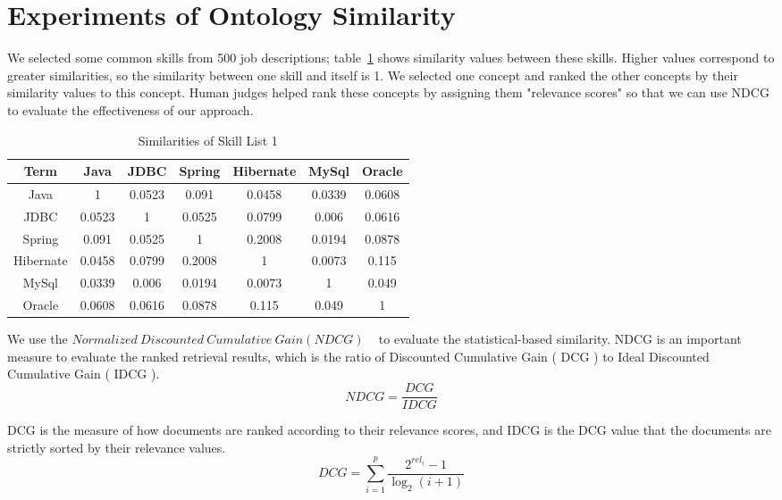 \section{Experiments of Ontology Similarity}

We selected some common skills from 500 job descriptions; table~\ref{tab:dismatrix3} shows similarity values between these skills. Higher values correspond to greater similarities, so the similarity between one skill and itself is 1. We selected one concept and ranked the other concepts by their similarity values to this concept. Human judges helped rank these concepts by assigning them "relevance scores" so that we can use NDCG to evaluate the effectiveness of our approach.

\begin{table}

\caption{Similarities of Skill List 1}
\begin{tabular}{ c | c c c c c c   }
 \hline
  Term       &  Java  &  JDBC  & Spring & Hibernate & MySql  & Oracle   \\  \hline
  Java   &   1    & 0.0523 & 0.091  &   0.0458  & 0.0339 & 0.0608    \\  \hline
    JDBC   & 0.0523 &   1    & 0.0525 &   0.0799  & 0.006  & 0.0616   \\  \hline
   Spring  & 0.091  & 0.0525 &   1    &   0.2008  & 0.0194 & 0.0878   \\  \hline
 Hibernate & 0.0458 & 0.0799 & 0.2008 &     1     & 0.0073 & 0.115    \\  \hline
   MySql   & 0.0339 & 0.006  & 0.0194 &   0.0073  &   1    & 0.049    \\  \hline
   Oracle  & 0.0608 & 0.0616 & 0.0878 &   0.115   & 0.049  &   1      \\  \hline
 \hline
\end{tabular}
\label{tab:dismatrix3}
\end{table}

We use the $ Normalized~Discounted~Cumulative~Gain ( NDCG )$ ~\cite{manning2008introduction} to evaluate the statistical-based similarity. NDCG is an important measure to evaluate the ranked retrieval results, which is the ratio of  Discounted Cumulative Gain ( DCG ) to Ideal Discounted Cumulative Gain ( IDCG ).
 $$ NDCG = \frac {DCG}{IDCG} $$

DCG is the measure of how documents are ranked according to their relevance scores, and IDCG is the DCG value that the documents are strictly sorted by their relevance values.
$$DCG =  \sum_{i=1}^{p} \frac {2^{rel_i} - 1}{\log_2(i+1)} $$

